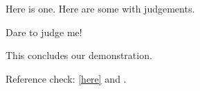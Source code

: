 \documentclass[11pt]{article}
\begin{document}
\begin{exe}
\ex\label{here} Here is one.
\ex Here are some with judgements.
 \begin{xlist}
 \ex
  \begin{xlist}
  \end{xlist}
 \ex Dare to judge me!
 \end{xlist}
\ex This concludes our demonstration.
\end{exe}

Reference check: \ref{here} and \Last.
\end{document}
